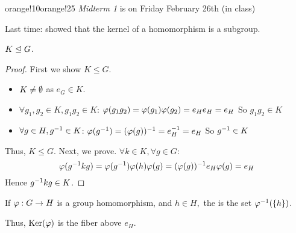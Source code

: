 \documentclass[notes.tex]{subfiles}
\begin{document}

\begin{classnote}{orange!10}{orange!25}
\emph{Midterm 1} is on Friday February 26th (in class)
\end{classnote}

Last time: showed that the kernel of a homomorphism is a subgroup.

\begin{proposition}
	$K\trianglelefteq G$.
\end{proposition}

\begin{proof}
	First we show $K\le G$.
	\begin{itemize}
		\item $K \ne \emptyset$ as $e_G\in K$.
		\item $\forall g_1, g_2\in K, g_1g_2\in K$:
		\tabin
			$\varphi(g_1g_2) = \varphi(g_1)\varphi(g_2) =e_He_H = e_H$
			So $g_1g_2\in K$
		\tabout
		\item $\forall g\in H, {g}^{-1} \in K$:
		\tabin
			$\varphi({g}^{-1}) = (\varphi(g))^{-1} = {e}^{-1}_H = e_H$
		\tabout
		So ${g}^{-1} \in K$
	\end{itemize}
	Thus, $K\le G$.
	Next, we prove.
	$\forall k\in K, \forall g\in G$:
		\[
			\varphi({g}^{-1}kg)
			= \varphi({g}^{-1})\varphi(h)\varphi(g)
			= (\varphi(g))^{-1}e_H\varphi(g)
			= e_H
		\]
	Hence ${g}^{-1}kg\in K$.
\end{proof}

\begin{defn}
	If $\varphi :G\to H$ is a group homomorphism, and $h\in H,$ the  is the set ${\varphi}^{-1}(\{h\})$.
\end{defn}

Thus, $\operatorname{\mathrm{Ker}}(\varphi)$ is the fiber above $e_H$.
\end{document}
